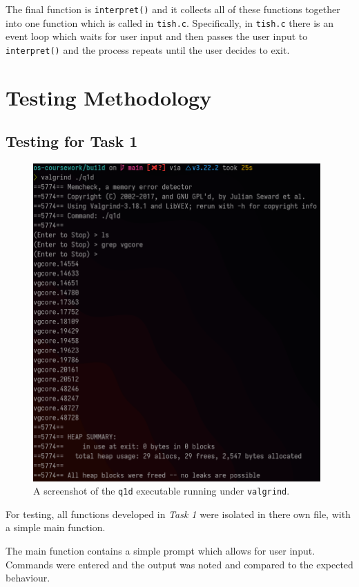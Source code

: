 \documentclass[12pt]{article}
\begin{document}
The final function is \texttt{interpret()} and it collects all
of these functions together into one function which is called in
\texttt{tish.c}. Specifically, in \texttt{tish.c} there is an
event loop which waits for user input and then passes the user
input to \texttt{interpret()} and the process repeats until the
user decides to exit.

\section{Testing Methodology}

\subsection{Testing for Task 1}

\begin{figure}[H]
\centering
\includegraphics[width=11cm]{q1d-test}
\caption{A screenshot of the \texttt{q1d} executable running
under \texttt{valgrind}.}
\end{figure}

For testing, all functions developed in \textit{Task 1} were
isolated in there own file, with a simple main function.

The main function contains a simple prompt which allows for user
input. Commands were entered and the output was noted and
compared to the expected behaviour.
\end{document}
